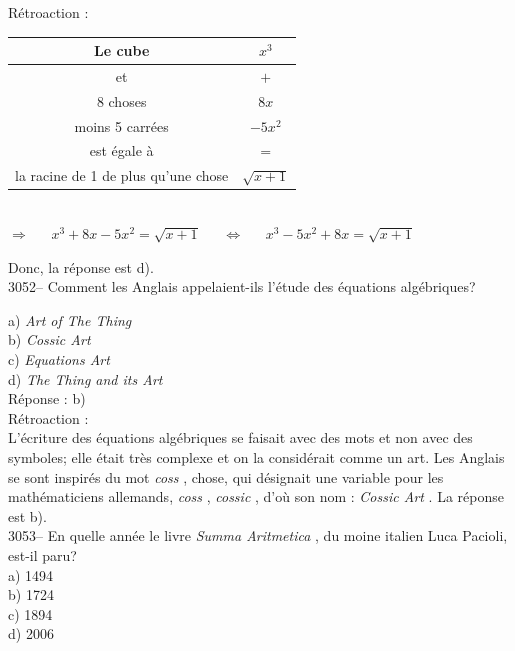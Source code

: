 \documentclass[letterpaper, 12pt]{article}
\begin{document}
R\'etroaction :\\
\begin{center}
\begin{tabular}{|c|c|}\hline
Le cube & $x^{3}$\\ \hline
et & $+$\\ \hline
8 choses & $8x$\\ \hline
moins 5 carr\'ees & $-5x^{2}$\\ \hline
est \'egale \`a & $=$\\ \hline
la racine de 1 de plus qu'une chose & $\sqrt{x + 1}$\\ \hline
\end{tabular}\\[4mm]
$\Longrightarrow \ \ \ \ \ \ \ x^{3} + 8x - 5x^{2} = \sqrt{x + 1} \ \ \ \ \ \ \ \Longleftrightarrow \ \ \ \ \ \ \ x^{3} - 5x^{2} + 8x = \sqrt{x + 1}$
\end{center}
Donc, la r\'eponse est d).\\


3052-- Comment les Anglais appelaient-ils l'\'etude des \'equations alg\'ebriques?

a) \og \emph{Art of The Thing} \fg\\
b) \og \emph{Cossic Art} \fg\\
c) \og \emph{Equations Art} \fg\\
d) \og \emph{The Thing and its Art} \fg\\

R\'eponse : b)\\

R\'etroaction :\\
L'\'ecriture des \'equations alg\'ebriques se faisait avec des mots et non avec des symboles; elle \'etait tr\`es complexe et on la consid\'erait comme un art. Les Anglais se sont inspir\'es du mot \og \emph{coss} \fg, chose, qui d\'esignait une variable pour les math\'ematiciens allemands, \og \emph{coss} \fg, \og \emph{cossic} \fg, d'o\`u son nom : \og \emph{Cossic Art} \fg. La r\'eponse est b).\\



3053-- En quelle ann\'ee le livre \og \emph{Summa Aritmetica} \fg, du moine italien Luca Pacioli, est-il paru?\\

a) 1494\\
b) 1724\\
c) 1894\\
d) 2006\\
\end{document}
